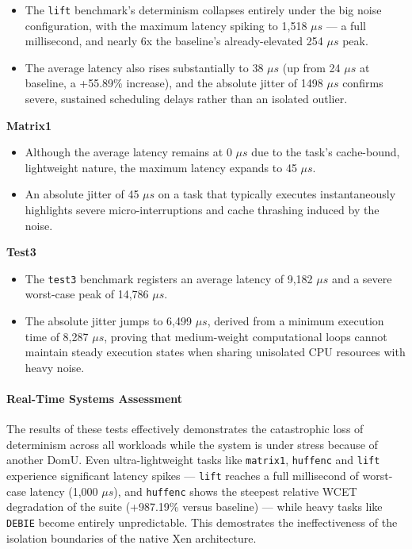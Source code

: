\begin{itemize}
\item
  The \texttt{lift} benchmark's determinism collapses entirely under the
  big noise configuration, with the maximum latency spiking to 1,518 $\mu s$
  --- a full millisecond, and nearly 6x the baseline's already-elevated
  254 $\mu s$ peak.
\item
  The average latency also rises substantially to 38 $\mu s$ (up from 24 $\mu s$
  at baseline, a +55.89\% increase), and the absolute jitter of 1498 $\mu s$
  confirms severe, sustained scheduling delays rather than an isolated
  outlier.
\end{itemize}

\textbf{Matrix1}

\begin{itemize}
\item
  Although the average latency remains at 0 $\mu s$ due to the task's
  cache-bound, lightweight nature, the maximum latency expands to 45 $\mu s$.
\item
  An absolute jitter of 45 $\mu s$ on a task that typically executes
  instantaneously highlights severe micro-interruptions and cache
  thrashing induced by the noise.
\end{itemize}

\textbf{Test3}

\begin{itemize}
\item
  The \texttt{test3} benchmark registers an average latency of 9,182 $\mu s$
  and a severe worst-case peak of 14,786 $\mu s$.
\item
  The absolute jitter jumps to 6,499 $\mu s$, derived from a minimum
  execution time of 8,287 $\mu s$, proving that medium-weight computational
  loops cannot maintain steady execution states when sharing unisolated
  CPU resources with heavy noise.
\end{itemize}

\paragraph{Real-Time Systems
Assessment}\label{real-time-systems-assessment-6}

The results of these tests effectively demonstrates the catastrophic
loss of determinism across all workloads while the system is under
stress because of another DomU. Even ultra-lightweight tasks like
\texttt{matrix1}, \texttt{huffenc} and \texttt{lift} experience
significant latency spikes --- \texttt{lift} reaches a full millisecond
of worst-case latency (1,000 $\mu s$), and \texttt{huffenc} shows the
steepest relative WCET degradation of the suite (+987.19\% versus
baseline) --- while heavy tasks like \texttt{DEBIE} become entirely
unpredictable. This demostrates the ineffectiveness of the isolation
boundaries of the native Xen architecture.

